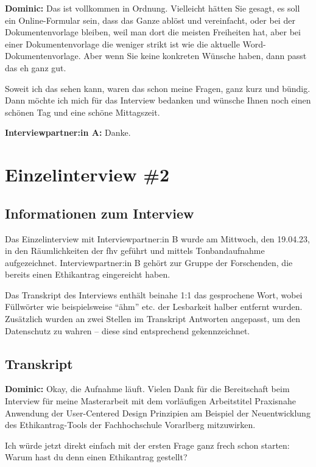\documentclass[a4paper,12pt,twoside]{scrreprt}
\begin{document}
\textbf{Dominic:} Das ist vollkommen in Ordnung. Vielleicht hätten Sie gesagt, es soll ein Online-Formular sein, dass das Ganze ablöst und vereinfacht, oder bei der Dokumentenvorlage bleiben, weil man dort die meisten Freiheiten hat, aber bei einer Dokumentenvorlage die weniger strikt ist wie die aktuelle Word-Dokumentenvorlage. Aber wenn Sie keine konkreten Wünsche haben, dann passt das eh ganz gut. 

Soweit ich das sehen kann, waren das schon meine Fragen, ganz kurz und bündig. Dann möchte ich mich für das Interview bedanken und wünsche Ihnen noch einen schönen Tag und eine schöne Mittagszeit.

\textbf{Interviewpartner:in A:} Danke.

\chapter{Einzelinterview \#2}
\label{appendix:interview-2}

\section{Informationen zum Interview}
\label{appendix:interview-2-infos}

Das Einzelinterview mit Interviewpartner:in B wurde am Mittwoch, den 19.04.23, in den Räumlichkeiten der \ac{fhv} geführt und mittels Tonbandaufnahme aufgezeichnet. Interviewpartner:in B gehört zur Gruppe der Forschenden, die bereits einen Ethikantrag eingereicht haben.

Das Transkript des Interviews enthält beinahe 1:1 das gesprochene Wort, wobei Füllwörter wie beispielsweise \enquote{ähm} etc. der Lesbarkeit halber entfernt wurden. Zusätzlich wurden an zwei Stellen im Transkript Antworten angepasst, um den Datenschutz zu wahren -- diese sind entsprechend gekennzeichnet.

\section{Transkript}
\label{appendix:interview-2-transkript}

\textbf{Dominic:} Okay, die Aufnahme läuft. Vielen Dank für die Bereitschaft beim Interview für meine Masterarbeit mit dem vorläufigen Arbeitstitel Praxisnahe Anwendung der User-Centered Design Prinzipien am Beispiel der Neuentwicklung des Ethikantrag-Tools der Fachhochschule Vorarlberg mitzuwirken.

Ich würde jetzt direkt einfach mit der ersten Frage ganz frech schon starten: Warum hast du denn einen Ethikantrag gestellt?
\end{document}
